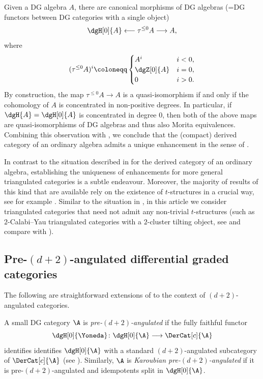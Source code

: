\documentclass[a4paper]{amsart}
\begin{document}
\begin{example}
  \label{ex:alebra_unique_enhancement}
  Given a DG algebra $A$, there are canonical morphisms of DG algebras (=DG
  functors between DG categories with a single object)
  \[
    \dgH[0]{A}\longleftarrow\tau^{\leq0}A\longrightarrow A,
  \]
  where
  \[
    (\tau^{\leq0}A)^i\coloneqq\begin{cases}A^i&i<0,\\\dgZ[0]{A}&i=0,\\0&i>0.\end{cases}
  \]
  By construction, the map $\tau^{\leq0}A\to A$ is a quasi-isomorphism if and
  only if the cohomology of $A$ is concentrated in non-positive degrees. In particular,
  if $\dgH{A}=\dgH[0]{A}$ is concentrated in degree $0$, then both of the above
  maps are quasi-isomorphisms of DG algebras and thus also Morita equivalences.
  Combining this observation with , we conclude that the
  (compact) derived category of an ordinary algebra admits a unique enhancement
  in the sense of .
\end{example}

\begin{remark}
  In contrast to the situation described in 
  for the derived category of an ordinary algebra, establishing the uniqueness
  of enhancements for more general triangulated categories is a subtle
  endeavour. Moreover, the majority of results of this kind that are available
  rely on the existence of $t$-structures in a crucial way, see for example
  \cite{LO10,CS18,CNS22}. Similar to the situation in \cite{Mur22}, in this
  article we consider triangulated categories that need not admit any
  non-trivial $t$-structures (such as $2$-Calabi--Yau triangulated categories
  with a $2$-cluster tilting object, see  and compare
  with \cite[Thm.~4.1]{ZZ12}).
\end{remark}

\subsection{Pre-$(d+2)$-angulated differential graded categories}

The following are straightforward extensions of
 to the context of
$(d+2)$-angulated categories.

\begin{definition}
  \label{def:pre-d+2-anguled_DG}
  A small DG category $\A$ is \emph{pre-$(d+2)$-angulated} if the fully faithful
  functor
  \[
    \dgH[0]{\Yoneda}\colon\dgH[0]{\A}\longrightarrow\DerCat[c]{\A}
  \]
  identifies identifies $\dgH[0]{\A}$ with a standard $(d+2)$-angulated
  subcategory of $\DerCat[c]{\A}$ (see ).
  Similarly, $\A$ is \emph{Karoubian pre-$(d+2)$-angulated} if it is
  pre-$(d+2)$-angulated and idempotents split in $\dgH[0]{\A}$.
\end{definition}
\end{document}
